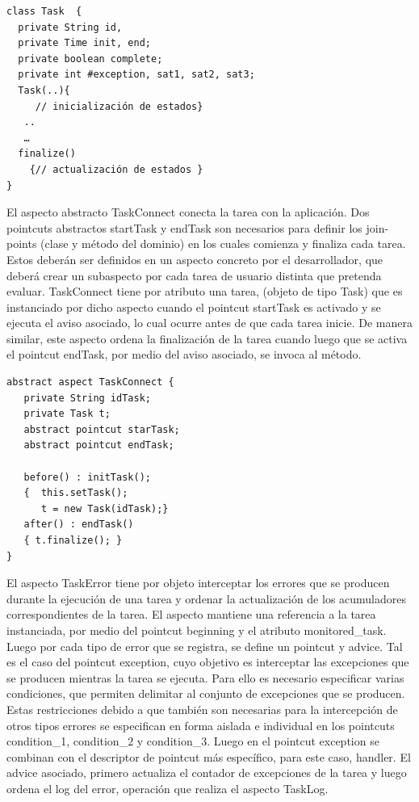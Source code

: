 \begin{verbatim}
class Task  {
  private String id,
  private Time init, end;
  private boolean complete;
  private int #exception, sat1, sat2, sat3;
  Task(..){
     // inicialización de estados}
   ..
   …
  finalize()
    {// actualización de estados }
}

\end{verbatim}

El aspecto abstracto TaskConnect conecta la tarea con la aplicación. Dos pointcuts abstractos startTask y endTask son necesarios para definir los join-points (clase y método del dominio)  en los cuales comienza y finaliza cada tarea. Estos deberán ser definidos en un aspecto concreto por el desarrollador, que deberá crear un subaspecto por cada tarea de usuario distinta que pretenda evaluar. TaskConnect  tiene por atributo una tarea, (objeto  de tipo Task) que es instanciado por dicho aspecto cuando el pointcut startTask es activado y se ejecuta el aviso asociado, lo cual ocurre antes de que cada tarea inicie. De manera similar, este aspecto ordena la finalización de la tarea cuando luego que se activa el pointcut endTask, por medio del aviso asociado, se invoca al método.  

\begin{verbatim}
abstract aspect TaskConnect {
   private String idTask;
   private Task t;
   abstract pointcut starTask; 
   abstract pointcut endTask;

   before() : initTask();
   {  this.setTask();
      t = new Task(idTask);}
   after() : endTask()
   { t.finalize(); }
}
\end{verbatim}

El aspecto TaskError tiene por objeto interceptar los errores que se producen durante la ejecución de una tarea y ordenar la actualización de los acumuladores correspondientes de la tarea. El aspecto mantiene una referencia a la tarea instanciada, por medio del pointcut beginning y el atributo monitored\_task. Luego por cada tipo de error que se registra, se define un pointcut y advice. Tal es el caso del pointcut exception, cuyo objetivo es interceptar las excepciones que se producen mientras la tarea se ejecuta. Para ello es necesario especificar varias condiciones, que permiten delimitar al conjunto de excepciones que se producen. Estas restricciones debido a que también son necesarias para la intercepción de otros tipos errores se especifican en forma aislada e individual en los pointcuts condition\_1, condition\_2 y condition\_3. Luego en el pointcut exception se combinan con el descriptor de pointcut más específico, para este caso, handler. El advice asociado, primero actualiza el contador de excepciones de la tarea y luego ordena el log del error, operación que realiza el aspecto TaskLog. 

